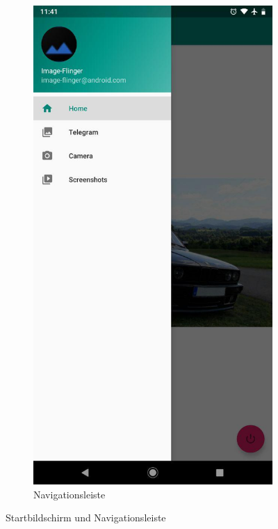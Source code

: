 \begin{figure}[H]
    \begin{subfigure}[b]{0.3\linewidth}
      \includegraphics[width=1\linewidth]{figures/nav.jpg}
      \caption{Navigationsleiste}
    \end{subfigure}
    \caption{Startbildschirm und Navigationsleiste}
    \label{fig:start_nav}
\end{figure}


